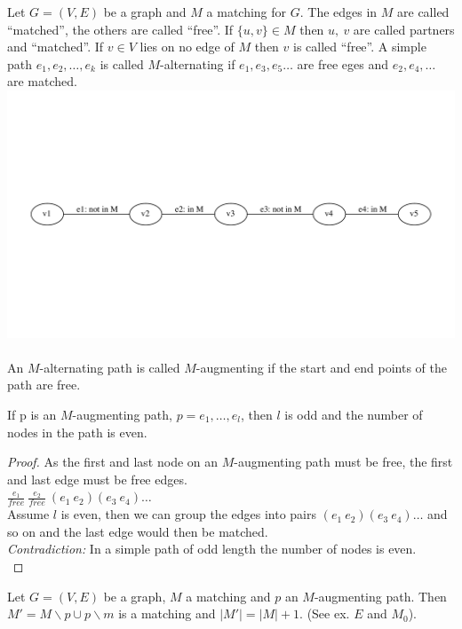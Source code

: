 \begin{definition}
	Let $G=(V,E)$ be a graph and $M$ a matching for $G$. The edges in $M$ are
	called ``matched'', the others are called ``free''. If $\{u,v\} \in M$ then
	$u,\:v$ are called partners and ``matched''. If $v \in V$ lies on no edge of
	$M$ then $v$ is called ``free''. A simple path $e_{1}, e_{2}, \dots, e_{k}$ is
	called $M$-alternating if $e_{1}, e_{3}, e_{5} \dots$ are free eges and
	$e_{2}, e_{4}, \ldots$ are matched.\\
		\includegraphics[scale=0.5]{diagrams/Chapter4_Example7.pdf}\\
		\\
	An $M$-alternating path is called $M$-augmenting if the start and end points of
	the path are free.
\end{definition}
\begin{lemma}
	If p is an $M$-augmenting path, $p=e_{1}, \dots, e_{l}$, then $l$ is odd and
	the number of nodes in the path is even.
\end{lemma}
\begin{proof}
	As the first and last node on an $M$-augmenting path must be free, the first
	and last edge must be free edges.\\
	$\frac{e_{1}}{free} \: \frac{e_{2}}{free} \: (e_{1} \: e_{2})(e_{3} \: e_{4})
	\dots$ \\
	Assume $l$ is even, then we can group the edges into pairs $ (e_{1} \:
	e_{2})(e_{3} \: e_{4}) \dots$ and so on and the last edge would then be
	matched.\\ \emph{Contradiction:} In a simple path of odd length the number of
	nodes is even.\\
\end{proof}
\begin{lemma}
	Let $G=(V,E)$ be a graph, $M$ a matching and $p$ an $M$-augmenting path. Then
	$M'=M \smallsetminus p \cup p \smallsetminus m$ is a matching and $|M'| =
	|M|+1$.
	(See ex. $E$ and $M_{0}$). \\
\end{lemma}
